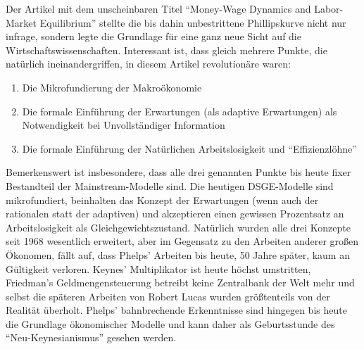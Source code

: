 Der Artikel mit dem unscheinbaren Titel "`Money-Wage Dynamics and Labor-Market Equilibrium"' \parencite{Phelps1968} stellte die bis dahin unbestrittene Phillipskurve nicht nur infrage, sondern legte die Grundlage für eine ganz neue Sicht auf die Wirtschaftswissenschaften. Interessant ist, dass gleich mehrere Punkte, die natürlich ineinandergriffen, in diesem Artikel revolutionäre waren:
\begin{enumerate}
\item Die Mikrofundierung der Makroökonomie
\item Die formale Einführung der Erwartungen (als adaptive Erwartungen) als Notwendigkeit bei Unvollständiger Information
\item Die formale Einführung der Natürlichen Arbeitslosigkeit und "`Effizienzlöhne"'
\end{enumerate}
Bemerkenswert ist insbesondere, dass alle drei genannten Punkte bis heute fixer Bestandteil der Mainstream-Modelle sind. Die heutigen DSGE-Modelle sind mikrofundiert, beinhalten das Konzept der Erwartungen (wenn auch der rationalen statt der adaptiven) und akzeptieren einen gewissen Prozentsatz an Arbeitslosigkeit als Gleichgewichtszustand. Natürlich wurden alle drei Konzepte seit 1968 wesentlich erweitert, aber im Gegensatz zu den Arbeiten anderer großen Ökonomen, fällt auf, dass Phelps' Arbeiten bis heute, 50 Jahre später, kaum an Gültigkeit verloren. Keynes' Multiplikator ist heute höchst umstritten, Friedman's Geldmengensteuerung betreibt keine Zentralbank der Welt mehr und selbst die späteren Arbeiten von Robert Lucas wurden größtenteils von der Realität überholt. Phelps' bahnbrechende Erkenntnisse sind hingegen bis heute die Grundlage ökonomischer Modelle und kann daher als Geburtsstunde des "`Neu-Keynesianismus"' gesehen werden.

